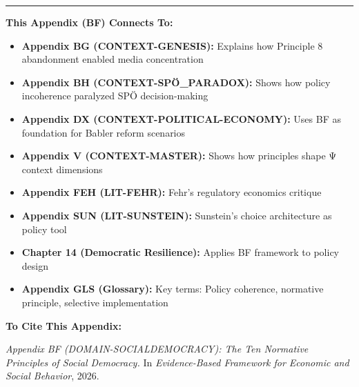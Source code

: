 \nocite{bcm_master}


\vspace{1em}
\hrule
\vspace{0.5em}

\begin{tcolorbox}[colback=orange!5!white, colframe=orange!75!black,
    title=Cross-Reference Links]

\textbf{This Appendix (BF) Connects To:}

\begin{itemize}[nosep]
\item \textbf{Appendix BG (CONTEXT-GENESIS):} Explains how Principle 8 abandonment enabled media concentration
\item \textbf{Appendix BH (CONTEXT-SPÖ_PARADOX):} Shows how policy incoherence paralyzed SPÖ decision-making
\item \textbf{Appendix DX (CONTEXT-POLITICAL-ECONOMY):} Uses BF as foundation for Babler reform scenarios
\item \textbf{Appendix V (CONTEXT-MASTER):} Shows how principles shape Ψ context dimensions
\item \textbf{Appendix FEH (LIT-FEHR):} Fehr's regulatory economics critique
\item \textbf{Appendix SUN (LIT-SUNSTEIN):} Sunstein's choice architecture as policy tool
\item \textbf{Chapter 14 (Democratic Resilience):} Applies BF framework to policy design
\item \textbf{Appendix GLS (Glossary):} Key terms: Policy coherence, normative principle, selective implementation
\end{itemize}

\textbf{To Cite This Appendix:}

\textit{Appendix BF (DOMAIN-SOCIALDEMOCRACY): The Ten Normative Principles of Social Democracy.}
In \textit{Evidence-Based Framework for Economic and Social Behavior}, 2026.

\end{tcolorbox}


